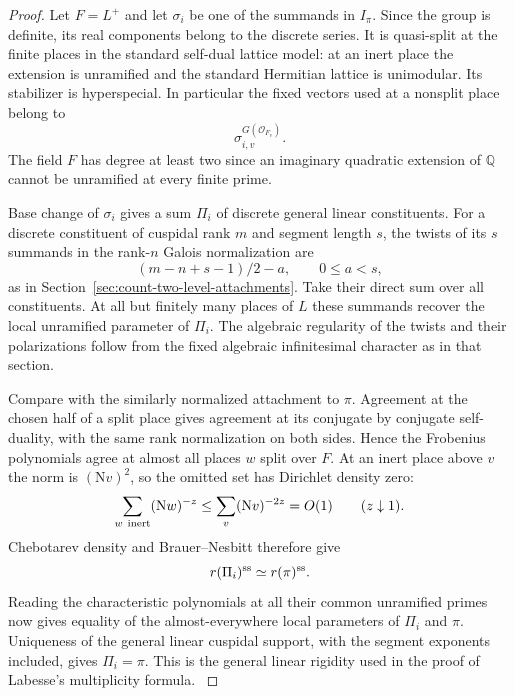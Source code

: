 \begin{proof}
Let \(F=L^+\) and let \(\sigma_i\) be one of the summands in \(I_\pi\). Since the group is definite, its real components belong to the discrete series. It is quasi-split at the finite places in the standard self-dual lattice model: at an inert place the extension is unramified and the standard Hermitian lattice is unimodular. Its stabilizer is hyperspecial. In particular the fixed vectors used at a nonsplit place belong to
\[
                   \sigma_{i,v}^{G(\mathcal O_{F_v})}.
\] The field \(F\) has degree at least two since an imaginary quadratic extension of \(\mathbb Q\) cannot be unramified at every finite prime.

Base change of \(\sigma_i\) gives a sum \(\Pi_i\) of discrete general linear constituents. For a discrete constituent of cuspidal rank \(m\) and segment length \(s\), the twists of its \(s\) summands in the rank-\(n\) Galois normalization are
\[
                         (m-n+s-1)/2-a,\qquad 0\le a<s,
\]
as in Section~\ref{sec:count-two-level-attachments}. Take their direct sum over all constituents. At all but finitely many places of \(L\) these summands recover the local unramified parameter of \(\Pi_i\). The algebraic regularity of the twists and their polarizations follow from the fixed algebraic infinitesimal character as in that section. \cite[Corollary~5.3]{labesse-cm} \cite[Theorem~2.1.1]{blggt}

Compare with the similarly normalized attachment to \(\pi\). Agreement at the chosen half of a split place gives agreement at its conjugate by conjugate self-duality, with the same rank normalization on both sides. Hence the Frobenius polynomials agree at almost all places \(w\) split over \(F\). At an inert place above \(v\) the norm is \((\mathrm N v)^2\), so the omitted set has Dirichlet density zero:
\[
 \sum_{w\ {\rm inert}}(\mathrm Nw)^{-z}\le\sum_v(\mathrm Nv)^{-2z}=O(1)\qquad(z\downarrow1).
\] Chebotarev density and Brauer--Nesbitt therefore give
\[
          r(\Pi_i)^{\rm ss}\simeq r(\pi)^{\rm ss}.
\]
Reading the characteristic polynomials at all their common unramified primes now gives equality of the almost-everywhere local parameters of \(\Pi_i\) and \(\pi\). Uniqueness of the general linear cuspidal support, with the segment exponents included, gives \(\Pi_i=\pi\). This is the general linear rigidity used in the proof of Labesse's multiplicity formula. \cite[proof of Theorem~5.4]{labesse-cm} \cite{moeglin-waldspurger}


\end{proof}
